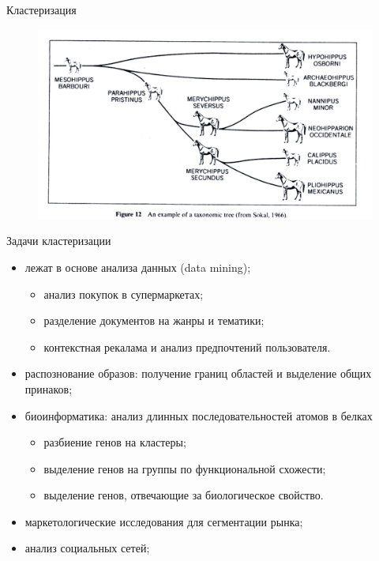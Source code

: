 \documentclass{beamer}
\begin{document}
\begin{frame}{Кластеризация}
\begin{figure}[h]
\centering
\includegraphics[scale=0.4]{images/lec07-pic06.png}
\end{figure}
\end{frame}

\begin{frame}{Задачи кластеризации}
\begin{itemize}
\item лежат в основе анализа данных (data mining);
	\begin{itemize}
	\item анализ покупок в супермаркетах;
	\item разделение документов на жанры и тематики;
	\item контекстная рекалама и анализ предпочтений пользователя.	
	\end{itemize}
\item распознование образов: получение границ областей и выделение общих принаков;
\item биоинформатика: анализ длинных последовательностей атомов в белках 	
	\begin{itemize}
	\item разбиение генов на кластеры;
	\item выделение генов на группы по функциональной схожести;
	\item выделение генов, отвечающие за биологическое свойство.	
	\end{itemize}
\item маркетологические исследования для сегментации рынка;	
\item анализ социальных сетей;
\end{itemize}
\end{frame}
\end{document}
